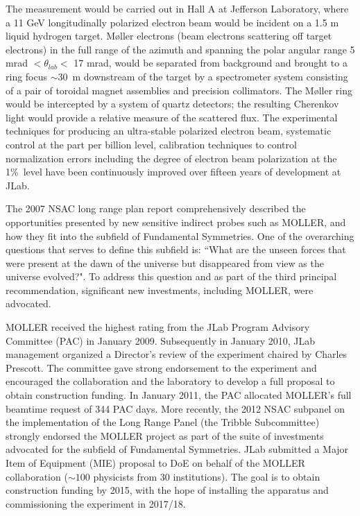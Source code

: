 The measurement would be carried out in Hall A at Jefferson Laboratory, where a 11 GeV longitudinally polarized electron beam would be incident on a 1.5 m liquid hydrogen target. M\o ller electrons (beam electrons scattering off target electrons) in the full range of the azimuth and spanning the polar angular range 5 mrad $<\theta_{lab}<$ 17 mrad, would be separated from background and brought to a ring focus $\sim 30$~m downstream of the target by a spectrometer system consisting of a pair of toroidal magnet assemblies and precision collimators. 
The M\o ller ring would be intercepted by a system of quartz detectors; the resulting Cherenkov light would provide a relative measure of the scattered flux. The experimental techniques for producing an ultra-stable polarized electron beam, systematic
control at the part per billion level, calibration techniques to control normalization errors including the degree of electron 
beam polarization at the 1\%\ level have been continuously improved over fifteen years of development at JLab.

The 2007 NSAC long range plan report  comprehensively described the opportunities presented by new sensitive indirect probes such as MOLLER, and how they fit into the subfield of Fundamental Symmetries.
One of the overarching questions that serves to define this subfield is: ``What are the unseen forces that were present at the dawn of the universe but disappeared from view as the universe evolved?". To address this question and as part of the third principal recommendation, significant new investments, including MOLLER, were advocated.

MOLLER received the highest rating from the JLab Program Advisory Committee (PAC) in January 2009.
Subsequently in January 2010, 
JLab management organized a Director's review of the experiment chaired by Charles Prescott. The committee
gave strong endorsement to the experiment and encouraged the collaboration and the laboratory to develop
a full proposal to obtain construction funding.  In January 2011, 
the PAC allocated MOLLER's full beamtime request of 344 PAC days. 
More recently, the 2012 NSAC subpanel on the implementation of the Long Range Panel (the Tribble 
 Subcommittee) strongly endorsed the MOLLER project as part of the suite of investments advocated for 
 the subfield of Fundamental Symmetries.
JLab submitted a Major Item of Equipment (MIE) proposal
to DoE on behalf of the MOLLER collaboration ($\sim 100$ physicists from 30 institutions).
The goal is to obtain construction funding by 2015, with 
the hope of installing the apparatus and commissioning the experiment in 2017/18. 


